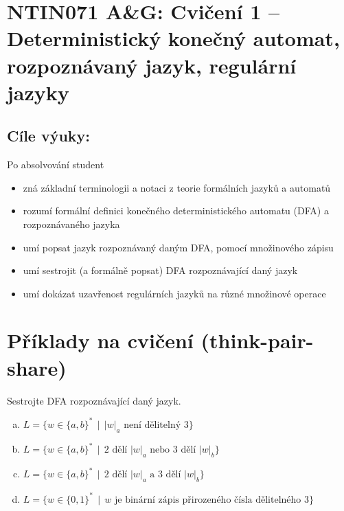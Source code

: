 \documentclass[a4paper,12pt]{amsart}
\begin{document}
\thispagestyle{empty}

\section*{NTIN071 A\&G: Cvičení 1 -- Deterministický konečný automat, rozpoznávaný jazyk, regulární jazyky}

\medskip

\subsection*{Cíle výuky:} Po absolvování student

\begin{itemize}\setlength{\itemsep}{0pt}
    \item zná základní terminologii a notaci z teorie formálních jazyků a automatů
    \item rozumí formální definici konečného deterministického automatu (DFA) a rozpoznávaného jazyka
    \item umí popsat jazyk rozpoznávaný daným DFA, pomocí množinového zápisu
    \item umí sestrojit (a formálně popsat) DFA rozpoznávající daný jazyk
    \item umí dokázat uzavřenost regulárních jazyků na různé množinové operace
\end{itemize}

\section*{Příklady na cvičení (think-pair-share)}

\medskip

\medskip\begin{problem} 
    
    Sestrojte DFA rozpoznávající daný jazyk.

    \medskip
    
    \begin{enumerate}[(a)]\setlength\itemsep{6pt}        
        \item $L=\{w\in\{a,b\}^* \,\mid\, |w|_a \text{ není dělitelný 3}\}$
        \item $L=\{w\in\{a,b\}^* \,\mid\,\text{2 dělí $|w|_a$ nebo 3 dělí $|w|_b$}\}$ 
        \item $L=\{w\in\{a,b\}^* \,\mid\, \text{2 dělí $|w|_a$ a 3 dělí $|w|_b$}\}$
        \item $L=\{w\in\{0,1\}^* \,\mid\, w\text{ je binární zápis přirozeného čísla dělitelného 3}\}$        
    \end{enumerate}

\end{problem}
\end{document}
